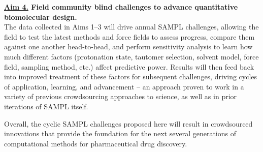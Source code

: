 \documentclass[11pt]{article}
\begin{document}
{\bf \underline{Aim 4.} Field community blind challenges to advance quantitative biomolecular design.} \\
The data collected in Aims 1--3 will drive annual SAMPL challenges, allowing the field to test the latest methods and force fields to assess progress, compare them against one another head-to-head, and perform sensitivity analysis to learn how much different factors (protonation state, tautomer selection, solvent model, force field, sampling method, etc.) affect predictive power. 
Results will then feed back into improved treatment of these factors for subsequent challenges, driving cycles of application, learning, and advancement -- an approach proven to work in a variety of previous crowdsourcing approaches to science, as well as in prior iterations of  SAMPL itself.

Overall, the cyclic SAMPL challenges proposed here will result in crowdsourced innovations that provide the foundation for the next several generations of computational methods for pharmaceutical drug discovery. 



\end{document}

